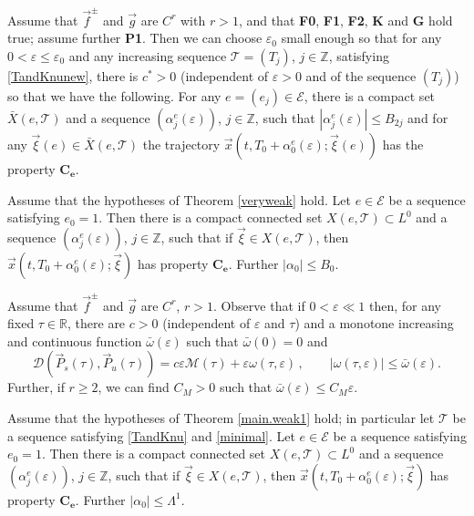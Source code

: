 \documentclass[10pt,a4paper]{amsart}
\def\EE{{\mathcal E}}
\def\MM{{\mathcal M}}
\def\P{\vec{P}}
\def\R{{\mathbb R}}
\def\TT{{\mathcal T}}
\def\Z{{\mathbb Z}}
\def\al{\alpha}
\def\dist{{\mathscr{D}}}
\def\ee{{e}}
\def\ep{\varepsilon}
\def\f{\vec{f}}
\def\g{\vec{g}}
\def\l1{\Lambda^{1}}
\def\xxi{\vec{\xi}}
\def\x{\vec{x}}
\newcommand\assump[1]{{\rm\textbf{#1}}}
\newcommand\bs[1]{{\boldsymbol{#1}}}
\begin{document}
\begin{theorem}\label{veryweak}
	Assume that   $\f^{\pm}$ and $\g$ are $C^r$ with  $r > 1$,   and that \assump{F0}, \assump{F1}, \assump{F2}, \assump{K} and \assump{G} hold true;
assume further    \assump{P1}.
Then we can choose $\ep_0$ small enough so that for any $0< \ep \le \ep_0$
and any increasing sequence $\mathcal{T}=(T_j)$, $j \in \Z$,  satisfying  \eqref{TandKnunew},
 there is $c^*>0$ (independent of $\ep>0$ and  of the sequence $(T_j)$)
so that we have the following.
For any $\ee=(\ee_j) \in \EE$,
there is a compact set $\bar{X}(\ee, \mathcal{T})$ and a sequence $(\al_j^{\ee}(\ep))$, $j \in \Z$,
such that $|\al_j^{\ee}(\ep)| \le B_{2j}$ and for any $\xxi(\ee) \in \bar{X}(\ee, \mathcal{T})$
  the trajectory $\x(t,T_0+ \al_0^{\ee}(\ep); \xxi(\ee))$ has the property
  $\mathbf{C_e}$.
\end{theorem}

\begin{theorem}\label{theoremkey}
  Assume that  the hypotheses of Theorem  \ref{veryweak} hold. Let $\ee \in \EE$ be a sequence satisfying
   $\ee_0=1$. Then there is a compact  connected  set $X(\ee, \TT)\subset L^0$ and a sequence $(\al_j^{\ee}(\ep))$, $j \in
   \Z$,
   such that if $\xxi \in X(\ee, \TT)$,
   then $\x(t,T_0+\al_0^\ee(\ep); \xxi)$ has property  $\bs{C_{\ee}}$.  Further $|\alpha_0| \le B_0$.
\end{theorem}

\begin{remark}\label{rMelni}
	Assume that $\f^{\pm}$ and $\g$ are $C^r$, $r>1$.
Observe that if $0<\ep \ll 1$ then,  for any fixed $\tau \in \R$,
	there are $c>0$ (independent of $\ep$ and $\tau$) and a monotone increasing and continuous function
$\bar{\omega}(\ep)$ such that $\bar{\omega}(0)=0$ and
	$$\dist(\P_s(\tau),\P_u(\tau))= c \ep \MM(\tau)+ \ep  \omega(\tau,\ep) \, , \qquad  |\omega(\tau,\ep)| \le
\bar{\omega}(\ep).$$
Further, if $r \ge 2$, we can find $C_M>0$ such that $\bar{\omega}(\ep) \le C_M \ep$.
\end{remark}

\begin{theorem}\label{theoremkeybis}
  Assume that  the hypotheses of Theorem \ref{main.weak1} hold;   in particular let $\TT$ be a sequence satisfying \eqref{TandKnu}
  and \eqref{minimal}.
   Let $\ee \in \EE$ be a sequence satisfying
   $\ee_0=1$. Then there is a compact  connected  set $X(\ee, \TT)\subset L^0$  and a sequence $(\al_j^{\ee}(\ep))$, $j \in
   \Z$,
   such that if $\xxi \in X(\ee, \TT)$,
   then $\x(t,T_0+\al_0^\ee(\ep); \xxi)$ has property  $\bs{C_{\ee}}$.  Further $|\alpha_0| \le \l1$.
\end{theorem}
\end{document}
